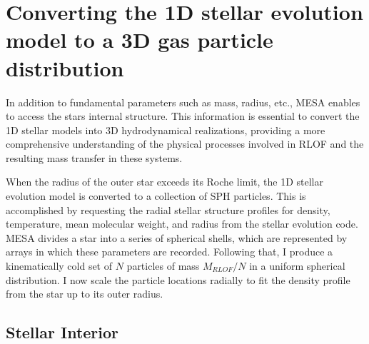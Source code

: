 \section{Converting the 1D stellar evolution model to a 3D gas particle distribution}\label{sec:1D_to_3D}

In addition to fundamental parameters such as mass, radius, etc., MESA enables to access the stars internal structure. This information is essential to convert the 1D stellar models into 3D hydrodynamical realizations, providing a more comprehensive understanding of the physical processes involved in RLOF and the resulting mass transfer in these systems.

When the radius of the outer star exceeds its Roche limit, the 1D stellar evolution model is converted to a collection of SPH particles. This is accomplished by requesting the radial stellar structure profiles for density, temperature, mean molecular weight, and radius from the stellar evolution code. MESA divides a star into a series of spherical shells, which are represented by arrays in which these parameters are recorded. Following that, I produce a kinematically cold set of $N$ particles of mass $M_{RLOF}/N$ in a uniform spherical distribution. I now scale the particle locations radially to fit the density profile from the star up to its outer radius.

\subsection{Stellar Interior}\label{sub:core}

